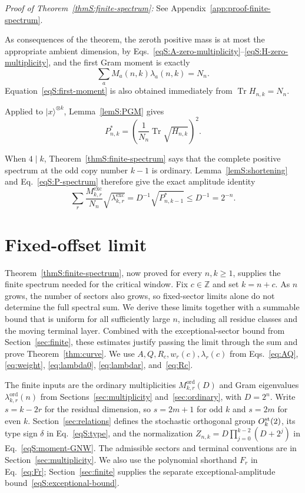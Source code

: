 \documentclass[journal,twocolumn]{IEEEtran}
\theoremstyle{definition}
\theoremstyle{plain}
\newcommand{\Tr}{\operatorname{Tr}}
\newcommand{\Ord}{\mathrm{ord}}
\newcommand{\Exc}{\mathrm{exc}}
\begin{document}
\noindent\emph{Proof of Theorem~\ref{thmS:finite-spectrum}:} See Appendix~\ref{app:proof-finite-spectrum}.\par

As consequences of the theorem, the zeroth positive mass is at most the
appropriate ambient dimension, by
Eqs.~\eqref{eqS:A-zero-multiplicity}--\eqref{eqS:H-zero-multiplicity}, and
the first Gram moment is exactly
\begin{equation}
 \sum_aM_a(n,k)\lambda_a(n,k)=N_n.
 \label{eqS:first-moment}
\end{equation}
Equation~\eqref{eqS:first-moment} is also obtained immediately from
$\Tr H_{n,k}=N_n$.

Applied to $|x\rangle^{\otimes k}$, Lemma~\ref{lemS:PGM} gives
\begin{equation}
 P^*_{n,k}=\left(\frac1{N_n}\Tr\sqrt{H_{n,k}}\right)^2.
 \label{eqS:P-spectrum}
\end{equation}

When $4\mid k$, Theorem~\ref{thmS:finite-spectrum} says that the complete
positive spectrum at the odd copy number $k-1$ is ordinary.
Lemma~\ref{lemS:shortening} and Eq.~\eqref{eqS:P-spectrum} therefore give
the exact amplitude identity
\begin{equation}
 \sum_r\frac{M^{\Exc}_{k,r}}{N_n}
 \sqrt{\lambda^{\Exc}_{k,r}}
 =D^{-1}\sqrt{P^*_{n,k-1}}\leq D^{-1}=2^{-n}.
 \label{eqS:exceptional-bound}
\end{equation}

\section{Fixed-offset limit}
\label{sec:limit}
Theorem~\ref{thmS:finite-spectrum}, now proved for every $n,k\geq1$,
supplies the finite spectrum needed for the critical window.  Fix
$c\in\mathbb Z$ and set $k=n+c$.  As $n$ grows, the number of sectors
also grows, so fixed-sector limits alone do not determine the full
spectral sum.  We derive these limits together with a summable bound
that is uniform for all sufficiently large $n$, including all residue
classes and the moving terminal layer.  Combined with the exceptional-sector bound from
Section~\ref{sec:finite}, these estimates justify passing the limit
through the sum and prove Theorem~\ref{thm:curve}.
We use $A,Q,R_c,w_r(c),\lambda_r(c)$ from
Eqs.~\eqref{eq:AQ}, \eqref{eq:weight}, \eqref{eq:lambda0},
\eqref{eq:lambdar}, and~\eqref{eq:Rc}.

The finite inputs are the ordinary multiplicities $M^{\Ord}_{k,r}(D)$
and Gram eigenvalues $\lambda^{\Ord}_{k,r}(n)$ from
Sections~\ref{sec:multiplicity} and~\ref{sec:ordinary}, with $D=2^n$.
Write $s=k-2r$ for the residual dimension, so $s=2m+1$ for odd $k$
and $s=2m$ for even $k$.  Section~\ref{sec:relations} defines the
stochastic orthogonal group $O_k^{\rm st}(2)$, its type sign $\delta$
in Eq.~\eqref{eqS:type}, and the normalization
$Z_{n,k}=D\prod_{j=0}^{k-2}(D+2^j)$ in
Eq.~\eqref{eqS:moment-GNW}.  The admissible sectors and terminal
conventions are in Section~\ref{sec:multiplicity}.  We also use the
polynomial shorthand $F_r$ in Eq.~\eqref{eq:Fr};
Section~\ref{sec:finite} supplies the separate exceptional-amplitude
bound~\eqref{eqS:exceptional-bound}.
\end{document}
